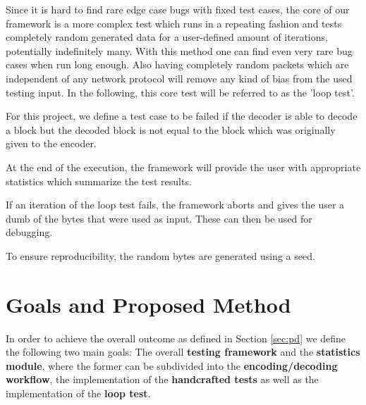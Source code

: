 \documentclass[a4paper,english,10pt,NET]{tumarticle}
\begin{document}
Since it is hard to find rare edge case bugs with fixed test cases, the core of our framework is a more complex test which runs in a repeating fashion and tests completely random generated data for a user-defined amount of iterations, potentially indefinitely many. With this method one can find even very rare bug cases when run long enough. Also having completely random packets which are independent of any network protocol will remove any kind of bias from the used testing input.
In the following, this core test will be referred to as the 'loop test'.

For this project, we define a test case to be failed if the decoder is able to decode a block but the decoded block is not equal to the block which was originally given to the encoder.

At the end of the execution, the framework will provide the user with appropriate statistics which summarize the test results. 

If an iteration of the loop test fails, the framework aborts and gives the user a dumb of the bytes that were used as input. These can then be used for debugging.

To ensure reproducibility, the random bytes are generated using a seed. 

\section{Goals and Proposed Method}\label{sec:milestones} %




In order to achieve the overall outcome as defined in Section \ref{sec:pd} we define the following two main goals: The overall \textbf{testing framework} and the \textbf{statistics module}, where the former can be subdivided into the \textbf{encoding/decoding workflow}, the implementation of the \textbf{handcrafted tests} as well as the implementation of the \textbf{loop test}.
\end{document}
